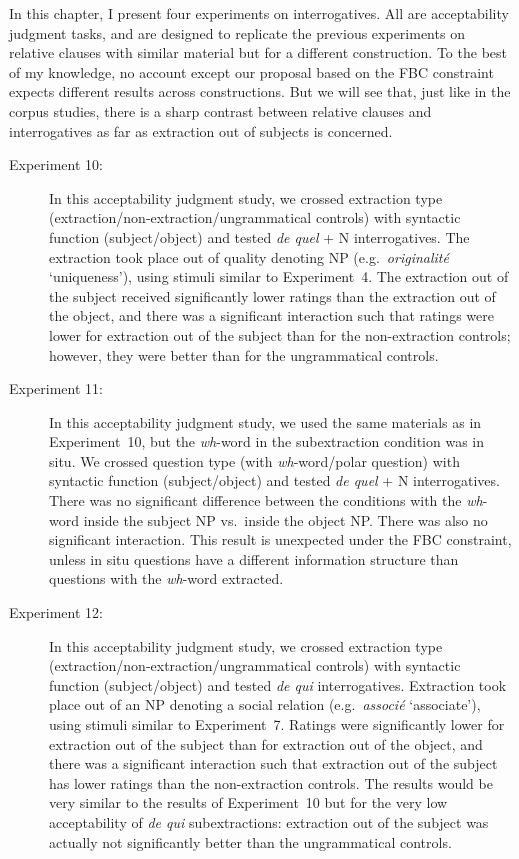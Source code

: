 In this chapter, I present four experiments on interrogatives. All are acceptability judgment tasks, and are designed to replicate the previous experiments on relative clauses with similar material but for a different construction. To the best of my knowledge, no account except our proposal based on the FBC constraint expects different results across constructions. But we will see that, just like in the corpus studies, there is a sharp contrast between relative clauses and interrogatives as far as extraction out of subjects is concerned.

\begin{description}
\item[Experiment 10:] In this acceptability judgment study, we crossed extraction type (extraction\slash non-extraction\slash ungrammatical controls) with syntactic function (subject\slash object) and tested \emph{de quel} + N interrogatives. The extraction took place out of quality denoting NP (e.g.\ \emph{originalité} `uniqueness'), using stimuli similar to Experiment~4. The extraction out of the subject received significantly lower ratings than the extraction out of the object, and there was a significant interaction such that ratings were lower for extraction out of the subject than for the non-extraction controls; however, they were better than for the ungrammatical controls. 

\item[Experiment 11:] In this acceptability judgment study, we used the same materials as in Experiment~10, but the \emph{wh}-word in the subextraction condition was in situ. We crossed question type (with \emph{wh}-word\slash polar question) with syntactic function (subject\slash object) and tested \emph{de quel} + N interrogatives. There was no significant difference between the conditions with the \emph{wh}-word inside the subject NP vs.\ inside the object NP. There was also no significant interaction. This result is unexpected under the FBC constraint, unless in situ questions have a different information structure than questions with the \emph{wh}-word extracted.

\item[Experiment 12:] In this acceptability judgment study, we crossed extraction type (extraction\slash non-extraction\slash ungrammatical controls) with syntactic function (subject\slash object) and tested \emph{de qui} interrogatives. Extraction took place out of an NP denoting a social relation (e.g.\ \emph{associé} `associate'), using stimuli similar to Experiment~7. Ratings were significantly lower for extraction out of the subject than for extraction out of the object, and there was a significant interaction such that extraction out of the subject has lower ratings than the non-extraction controls. The results would be very similar to the results of Experiment~10 but for the very low acceptability of \emph{de qui} subextractions: extraction out of the subject was actually not significantly better than the ungrammatical controls. 


\end{description}
